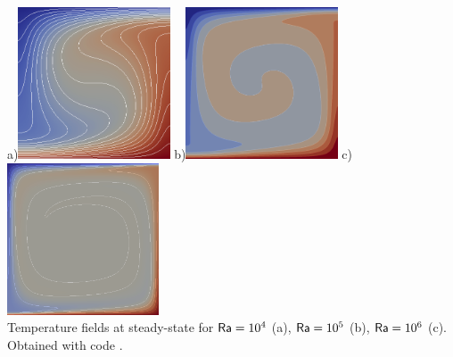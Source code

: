 \begin{center}
a)\includegraphics[width=4.5cm]{images/benchmark_blbc89/temp1a}
b)\includegraphics[width=4.5cm]{images/benchmark_blbc89/temp1b}
c)\includegraphics[width=4.5cm]{images/benchmark_blbc89/temp1c}\\
{\captionfont Temperature fields at steady-state for 
${\mathsf{Ra}}=10^4$ (a), ${\mathsf{Ra}}=10^5$ (b), ${\mathsf{Ra}}=10^6$ (c).
Obtained with \elefant code \cite{thie14}.}
\end{center}


